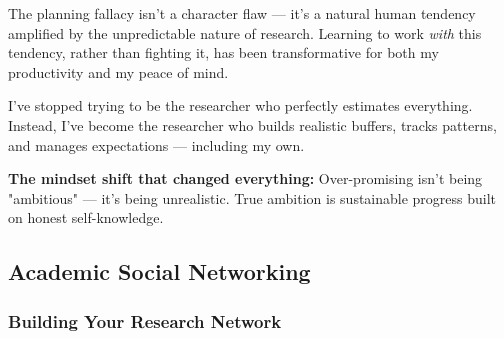 \documentclass[11pt,a4paper]{article}
\begin{document}
\begin{tcolorbox}[colback=purple!5,colframe=purple!40,title={My Personal Realization}]
The planning fallacy isn't a character flaw — it's a natural human tendency amplified by the unpredictable nature of research. Learning to work \textit{with} this tendency, rather than fighting it, has been transformative for both my productivity and my peace of mind.

I've stopped trying to be the researcher who perfectly estimates everything. Instead, I've become the researcher who builds realistic buffers, tracks patterns, and manages expectations — including my own.

\textbf{The mindset shift that changed everything:} Over-promising isn't being "ambitious" — it's being unrealistic. True ambition is sustainable progress built on honest self-knowledge.
\end{tcolorbox}

\subsection{Academic Social Networking}

\subsubsection{Building Your Research Network}
\end{document}
